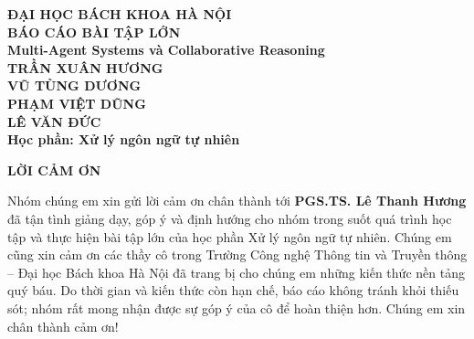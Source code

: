 \documentclass[a4paper,13pt,twoside]{report}
\begin{document}
\begin{titlepage}
\thispagestyle{empty}
\begin{center}

{\textbf{\large{ĐẠI HỌC BÁCH KHOA HÀ NỘI}}}\\[4cm]

{\textbf{\huge{BÁO CÁO BÀI TẬP LỚN}}}\\[1cm]
{\textbf{\Large{Multi-Agent Systems và Collaborative Reasoning}}}\\[1cm]

{\textbf{\large{TRẦN XUÂN HƯƠNG}}}\\
{\textbf{\large{VŨ TÙNG DƯƠNG}}}\\
{\textbf{\large{PHẠM VIỆT DŨNG}}}\\
{\textbf{\large{LÊ VĂN ĐỨC}}}\\[0.5cm]

{\textbf{\large{Học phần: Xử lý ngôn ngữ tự nhiên}}}\\

\vspace{2cm}
\begin{table}[H]
\centering
{}
\end{table}
\end{center}
\end{titlepage}


\thispagestyle{fancy}
\begin{center}
\LARGE\textbf{LỜI CẢM ƠN}
\end{center}
\vspace{1cm}
Nhóm chúng em xin gửi lời cảm ơn chân thành tới \textbf{PGS.TS. Lê Thanh Hương} đã tận tình giảng
dạy, góp ý và định hướng cho nhóm trong suốt quá trình học tập và thực hiện bài tập lớn của học phần
Xử lý ngôn ngữ tự nhiên. Chúng em cũng xin cảm ơn các thầy cô trong Trường Công nghệ Thông tin và
Truyền thông -- Đại học Bách khoa Hà Nội đã trang bị cho chúng em những kiến thức nền tảng quý báu.
Do thời gian và kiến thức còn hạn chế, báo cáo không tránh khỏi thiếu sót; nhóm rất mong nhận được
sự góp ý của cô để hoàn thiện hơn. Chúng em xin chân thành cảm ơn!
\newpage
\end{document}
